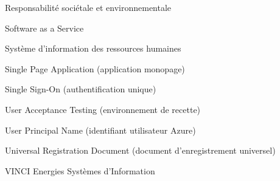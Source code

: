 \begin{description}[style=nextline,leftmargin=3cm,labelwidth=2.8cm]
  \item[RSE] Responsabilité sociétale et environnementale
  \item[SaaS] Software as a Service
  \item[SIRH] Système d'information des ressources humaines
  \item[SPA] Single Page Application (application monopage)
  \item[SSO] Single Sign-On (authentification unique)
  \item[UAT] User Acceptance Testing (environnement de recette)
  \item[UPN] User Principal Name (identifiant utilisateur Azure)
  \item[URD] Universal Registration Document (document d'enregistrement universel)
  \item[VESI] VINCI Energies Systèmes d'Information
\end{description}
